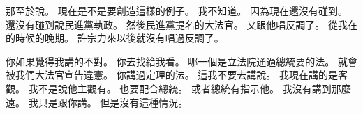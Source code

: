\hypertarget{w01:cue:1957}{}那至於說。
\hypertarget{w01:cue:1958}{}現在是不是要創造這樣的例子。
\hypertarget{w01:cue:1959}{}我不知道。
\hypertarget{w01:cue:1960}{}因為現在還沒有碰到。
\hypertarget{w01:cue:1961}{}還沒有碰到說民進黨執政。
\hypertarget{w01:cue:1962}{}然後民進黨提名的大法官。
\hypertarget{w01:cue:1963}{}又跟他唱反調了。
\hypertarget{w01:cue:1964}{}從我在的時候的晚期。
\hypertarget{w01:cue:1965}{}許宗力來以後就沒有唱過反調了。

\hypertarget{w01:cue:1966}{}你如果覺得我講的不對。
\hypertarget{w01:cue:1967}{}你去找給我看。
\hypertarget{w01:cue:1968}{}哪一個是立法院通過總統要的法。
\hypertarget{w01:cue:1969}{}就會被我們大法官宣告違憲。
\hypertarget{w01:cue:1970}{}你講過定理的法。
\hypertarget{w01:cue:1971}{}這我不要去講說。
\hypertarget{w01:cue:1972}{}我現在講的是客觀。
\hypertarget{w01:cue:1973}{}我不是說他主觀有。
\hypertarget{w01:cue:1974}{}也要配合總統。
\hypertarget{w01:cue:1975}{}或者總統有指示他。
\hypertarget{w01:cue:1976}{}我沒有講到那麼遠。
\hypertarget{w01:cue:1977}{}我只是跟你講。
\hypertarget{w01:cue:1978}{}但是沒有這種情況。

